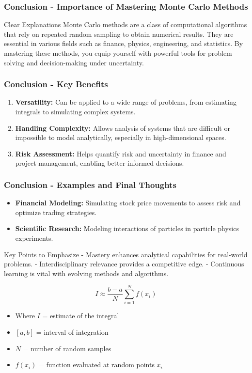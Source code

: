 \documentclass[aspectratio=169]{beamer}
\begin{document}
\begin{frame}[fragile]
    \frametitle{Conclusion - Importance of Mastering Monte Carlo Methods}
    \begin{block}{Clear Explanations}
    Monte Carlo methods are a class of computational algorithms that rely on repeated random sampling to obtain numerical results. 
    They are essential in various fields such as finance, physics, engineering, and statistics. By mastering these methods, you equip yourself with powerful tools for problem-solving and decision-making under uncertainty.
    \end{block}
\end{frame}

\begin{frame}[fragile]
    \frametitle{Conclusion - Key Benefits}
    \begin{enumerate}
        \item \textbf{Versatility:} Can be applied to a wide range of problems, from estimating integrals to simulating complex systems.
        \item \textbf{Handling Complexity:} Allows analysis of systems that are difficult or impossible to model analytically, especially in high-dimensional spaces.
        \item \textbf{Risk Assessment:} Helps quantify risk and uncertainty in finance and project management, enabling better-informed decisions.
    \end{enumerate}
\end{frame}

\begin{frame}[fragile]
    \frametitle{Conclusion - Examples and Final Thoughts}
    \begin{itemize}
        \item \textbf{Financial Modeling:} Simulating stock price movements to assess risk and optimize trading strategies.
        \item \textbf{Scientific Research:} Modeling interactions of particles in particle physics experiments.
    \end{itemize}
    
    \begin{block}{Key Points to Emphasize}
        - Mastery enhances analytical capabilities for real-world problems.
        - Interdisciplinary relevance provides a competitive edge.
        - Continuous learning is vital with evolving methods and algorithms.
    \end{block}

    \begin{equation}
        I \approx \frac{b-a}{N} \sum_{i=1}^{N} f(x_i)
    \end{equation}
    \begin{itemize}
        \item Where \( I \) = estimate of the integral
        \item \( [a, b] \) = interval of integration
        \item \( N \) = number of random samples
        \item \( f(x_i) \) = function evaluated at random points \( x_i \)
    \end{itemize}
\end{frame}
\end{document}
